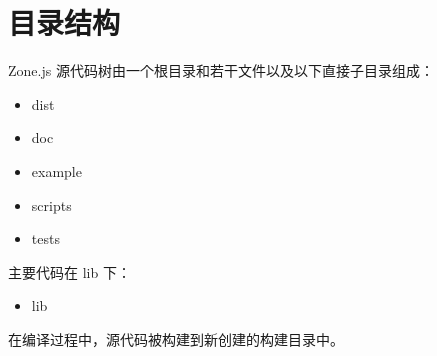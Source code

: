 \section{目录结构}


Zone.js 源代码树由一个根目录和若干文件以及以下直接子目录组成：

\begin{itemize}
  \item dist
  \item doc
  \item example
  \item scripts
  \item tests
\end{itemize}


主要代码在 lib 下：

\begin{itemize}
  \item lib
\end{itemize}


在编译过程中，源代码被构建到新创建的构建目录中。





